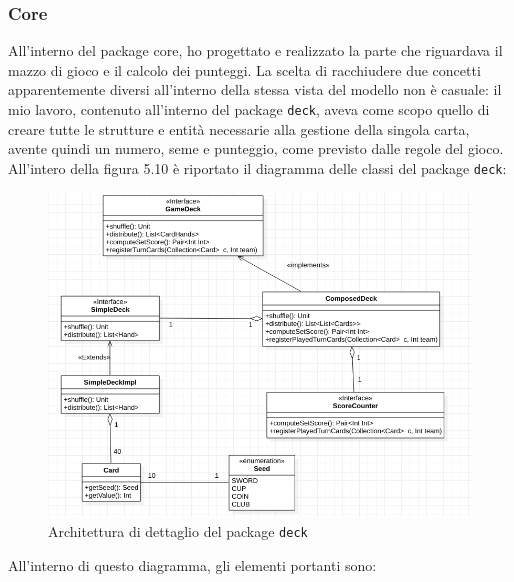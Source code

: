 \subsubsection{Core}
All'interno del package core, ho progettato e realizzato la parte che riguardava il mazzo di gioco e il calcolo dei punteggi.
La scelta di racchiudere due concetti apparentemente diversi all'interno della stessa vista del modello non è casuale: il mio lavoro, contenuto all'interno del package \texttt{deck}, aveva come scopo quello di creare tutte le strutture e entità necessarie alla gestione della singola carta, avente quindi un numero, seme e punteggio, come previsto dalle regole del gioco.
All'intero della figura 5.10 è riportato il diagramma delle classi del package \texttt{deck}:
 \begin{figure}[H]
	\includegraphics[width=\textwidth,height=\textheight,keepaspectratio]{deckArchitecture}
	\caption{Architettura di dettaglio del package \texttt{deck}}
\end{figure}
All'interno di questo diagramma, gli elementi portanti sono:
